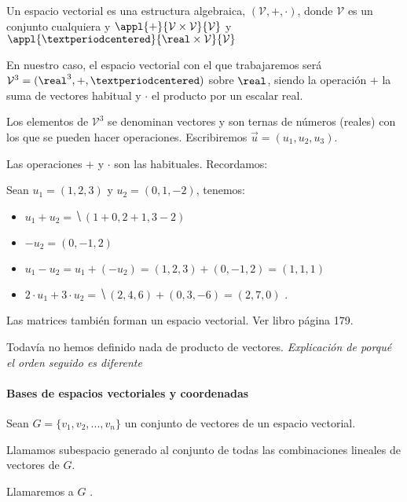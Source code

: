\begin{defn}
Un espacio vectorial es una estructura algebraica, $(\mathcal{V},+,·)$, donde $\mathcal{V}$ es un conjunto cualquiera y $\appl{+}{\mathcal{V}\times \mathcal{V}}{\mathcal{V}}$ y $\appl{·}{\real\times \mathcal{V}}{\mathcal{V}}$
\end{defn}

En nuestro caso, el espacio vectorial con el que trabajaremos será $\mathcal{V}^3 = (\real^3, + , ·)$ sobre $\real$, siendo la operación $+$ la suma de vectores habitual y $·$ el producto por un escalar real.

Los elementos de $\mathcal{V}^3$ se denominan vectores y son ternas de números (reales) con los que se pueden hacer operaciones. 
%
Escribiremos $\vec{u} = (u_1,u_2,u_3)$.

Las operaciones $+$ y $·$ son las habituales. 
%
Recordamos:

\begin{example}
Sean $u_1 = (1,2,3)$ y $u_2 = (0,1,-2)$, tenemos:
  \begin{itemize}
      \item $u_1 + u_2 = \hide{(1+0, 2+1, 3-2)}$
      \item $-u_2 = (0,-1,2)$
      \item $u_1-u_2 = u_1+ (-u_2) = (1,2,3) + (0,-1,2) = (1,1,1)$
      \item $2·u_1 + 3·u_2 = \hide{(2,4,6) + (0,3,-6) = (2,7,0)}$
      \obs {}.
  \end{itemize}
\end{example}

\obs Las matrices también forman un espacio vectorial. Ver libro página 179.

\obs Todavía no hemos definido nada de producto de vectores. \textit{Explicación de porqué el orden seguido es diferente}

\paragraph{Bases de espacios vectoriales y coordenadas}

\begin{defn} 
Sean $ G = \{v_1,v_2,...,v_n\}$ un conjunto de vectores de un espacio vectorial.

Llamamos subespacio generado al conjunto de todas las combinaciones lineales de vectores de $G$.

\obs Llamaremos a $G$ .
\end{defn}


